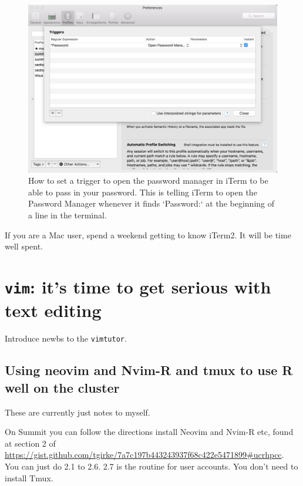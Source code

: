 \documentclass[]{krantz}
\begin{document}
\begin{figure}
\includegraphics[width=25.64in]{figs/iterm-pw-trigger} \caption{How to set a trigger to open the password manager in iTerm to be able to pass in your password.  This is telling iTerm to open the Password Manager whenever it finds `Password:` at the beginning of a line in the terminal.}\label{fig:iterm-trigger}
\end{figure}

If you are a Mac user, spend a weekend getting to know iTerm2. It will be time well spent.

\hypertarget{vim-its-time-to-get-serious-with-text-editing}{%
\section{\texorpdfstring{\texttt{vim}: it's time to get serious with text editing}{vim: it's time to get serious with text editing}}\label{vim-its-time-to-get-serious-with-text-editing}}

Introduce newbs to the \texttt{vimtutor}.

\hypertarget{using-neovim-and-nvim-r-and-tmux-to-use-r-well-on-the-cluster}{%
\subsection{Using neovim and Nvim-R and tmux to use R well on the cluster}\label{using-neovim-and-nvim-r-and-tmux-to-use-r-well-on-the-cluster}}

These are currently just notes to myself.

On Summit you can follow the directions install Neovim and Nvim-R etc, found
at section 2 of \url{https://gist.github.com/tgirke/7a7c197b443243937f68c422e5471899\#ucrhpcc}.
You can just do 2.1 to 2.6. 2.7 is the routine for user accounts. You don't need to install Tmux.
\end{document}
